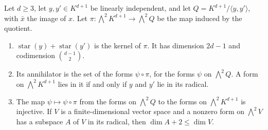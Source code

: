 \begin{lemma}
  \label{lem:pencil-d-two-stars}
  \leanok
  Let $d \ge 3$, let $y, y' \in K^{d+1}$ be linearly independent, and let
  $Q = K^{d+1} / \langle y, y' \rangle$, with $\bar x$ the image of $x$.
  Let $\pi \colon \bigwedge^2 K^{d+1} \to \bigwedge^2 Q$ be the map
  induced by the quotient.
  \begin{enumerate}
    \item $\operatorname{star}(y) + \operatorname{star}(y')$ is the
      kernel of $\pi$. It has dimension $2d - 1$ and codimension
      $\binom{d-1}{2}$.
    \item Its annihilator is the set of the forms $\psi \circ \pi$, for
      the forms $\psi$ on $\bigwedge^2 Q$. A form on
      $\bigwedge^2 K^{d+1}$ lies in it if and only if $y$ and $y'$ lie in
      its radical.
    \item The map $\psi \mapsto \psi \circ \pi$ from the forms on
      $\bigwedge^2 Q$ to the forms on $\bigwedge^2 K^{d+1}$ is injective.
      If $V$ is a finite-dimensional vector space and a nonzero form on
      $\bigwedge^2 V$ has a subspace $A$ of $V$ in its radical, then
      $\dim A + 2 \le \dim V$.
  \end{enumerate}
\end{lemma}
